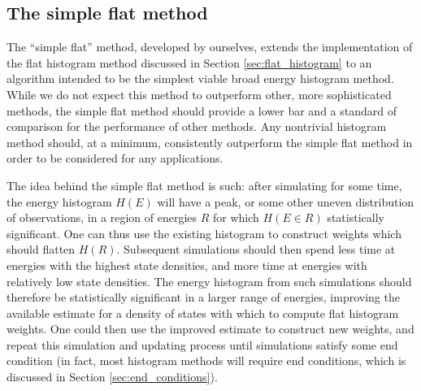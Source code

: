 \documentclass[11pt]{article}
\newcommand{\p}[1]{\left(#1\right)} %
\begin{document}
\subsection{The simple flat method}
\label{sec:simple_flat}

The ``simple flat'' method, developed by ourselves, extends the
implementation of the flat histogram method discussed in Section
\ref{sec:flat_histogram} to an algorithm intended to be the simplest
viable broad energy histogram method. While we do not expect this
method to outperform other, more sophisticated methods, the simple
flat method should provide a lower bar and a standard of comparison
for the performance of other methods. Any nontrivial histogram method
should, at a minimum, consistently outperform the simple flat method
in order to be considered for any applications.

The idea behind the simple flat method is such: after simulating for
some time, the energy histogram $H\p{E}$ will have a peak, or some
other uneven distribution of observations, in a region of energies $R$
for which $H\p{E\in R}$ statistically significant. One can thus use
the existing histogram to construct weights which should flatten
$H\p{R}$. Subsequent simulations should then spend less time at
energies with the highest state densities, and more time at energies
with relatively low state densities. The energy histogram from such
simulations should therefore be statistically significant in a larger
range of energies, improving the available estimate for a density of
states with which to compute flat histogram weights. One could then
use the improved estimate to construct new weights, and repeat this
simulation and updating process until simulations satisfy some end
condition (in fact, most histogram methods will require end
conditions, which is discussed in Section \ref{sec:end_conditions}).
\end{document}
